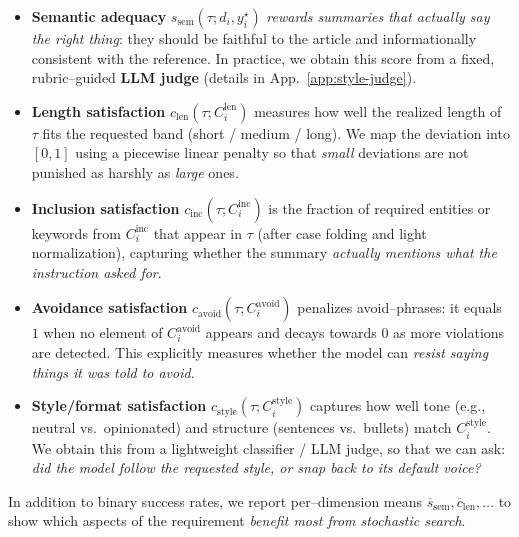 \begin{itemize}[leftmargin=1.5em,noitemsep]
  \item \textbf{Semantic adequacy}
        $s_{\text{sem}}(\tau; d_i, y_i^\star)$
        \emph{rewards summaries that actually say the right thing}:
        they should be faithful to the article and informationally
        consistent with the reference. In practice, we obtain this
        score from a fixed, rubric--guided \textbf{LLM judge} (details
        in App.~\ref{app:style-judge}).
  \item \textbf{Length satisfaction}
        $c_{\text{len}}(\tau; C^{\text{len}}_i)$ measures how well the
        realized length of $\tau$ fits the requested band (short /
        medium / long). We map the deviation into $[0,1]$ using a
        piecewise linear penalty so that \emph{small} deviations are not
        punished as harshly as \emph{large} ones.
  \item \textbf{Inclusion satisfaction}
        $c_{\text{inc}}(\tau; C^{\text{inc}}_i)$ is the fraction of
        required entities or keywords from $C^{\text{inc}}_i$ that
        appear in $\tau$ (after case folding and light normalization),
        capturing whether the summary \emph{actually mentions what the
        instruction asked for}.
  \item \textbf{Avoidance satisfaction}
        $c_{\text{avoid}}(\tau; C^{\text{avoid}}_i)$ penalizes
        avoid--phrases: it equals $1$ when no element of
        $C^{\text{avoid}}_i$ appears and decays towards $0$ as more
        violations are detected. This explicitly measures whether the
        model can \emph{resist saying things it was told to avoid}.
  \item \textbf{Style/format satisfaction}
        $c_{\text{style}}(\tau; C^{\text{style}}_i)$ captures how well
        tone (e.g., neutral vs.\ opinionated) and structure (sentences
        vs.\ bullets) match $C^{\text{style}}_i$. We obtain this from a
        lightweight classifier / LLM judge, so that we can ask:
        \emph{did the model follow the requested style, or snap back to
        its default voice?}
\end{itemize}
In addition to binary success rates, we report per--dimension means
$\overline{s}_{\text{sem}}, \overline{c}_{\text{len}}, \dots$ to show
which aspects of the requirement \emph{benefit most from stochastic
search}.

